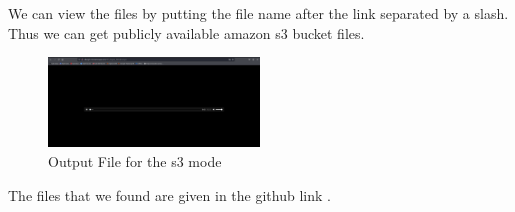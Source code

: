 \documentclass[12 pt]{article}
\begin{document}
\newline
We can view the files by putting the file name after the link separated by a slash. Thus we can get publicly available amazon s3 bucket files.
\begin{figure}[!htbp]
    \centering
    \includegraphics[width=0.5\textwidth]{s3_Output_Success_File.png}
    \caption{Output File for the s3 mode}
    \label{fig: s3 Output Success File}
\end{figure}
\newline
The files that we found are given in the github link \cite{github_output}.
\end{document}
